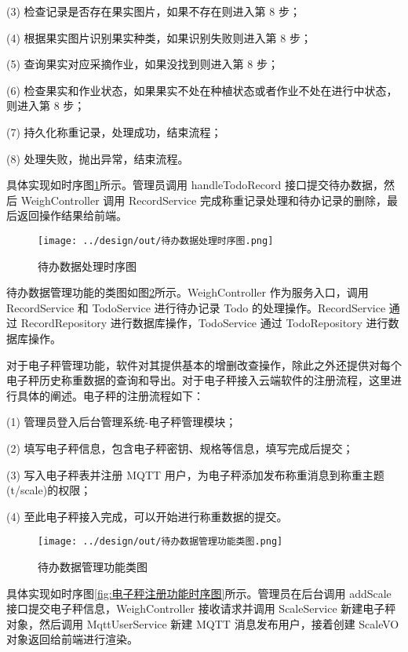 (3) 检查记录是否存在果实图片，如果不存在则进入第 8 步；

(4) 根据果实图片识别果实种类，如果识别失败则进入第 8 步；

(5) 查询果实对应采摘作业，如果没找到则进入第 8 步；

(6) 检查果实和作业状态，如果果实不处在种植状态或者作业不处在进行中状态，则进入第 8 步；

(7) 持久化称重记录，处理成功，结束流程；

(8) 处理失败，抛出异常，结束流程。

具体实现如时序图\ref{fig:待办数据处理时序图}所示。管理员调用 handleTodoRecord 接口提交待办数据，然后 WeighController 调用 RecordService 完成称重记录处理和待办记录的删除，最后返回操作结果给前端。

\begin{figure}
    \centering
    \texttt{[image: ../design/out/待办数据处理时序图.png]}
    \caption{待办数据处理时序图}
    \label{fig:待办数据处理时序图}
\end{figure}

待办数据管理功能的类图如图\ref{fig:待办数据管理功能类图}所示。WeighController 作为服务入口，调用 RecordService 和 TodoService 进行待办记录 Todo 的处理操作。RecordService 通过 RecordRepository 进行数据库操作，TodoService 通过 TodoRepository 进行数据库操作。

对于电子秤管理功能，软件对其提供基本的增删改查操作，除此之外还提供对每个电子秤历史称重数据的查询和导出。对于电子秤接入云端软件的注册流程，这里进行具体的阐述。电子秤的注册流程如下：

(1) 管理员登入后台管理系统-电子秤管理模块；

(2) 填写电子秤信息，包含电子秤密钥、规格等信息，填写完成后提交；

(3) 写入电子秤表并注册 MQTT 用户，为电子秤添加发布称重消息到称重主题(t/scale)的权限；

(4) 至此电子秤接入完成，可以开始进行称重数据的提交。

\begin{figure}
    \centering
    \texttt{[image: ../design/out/待办数据管理功能类图.png]}
    \caption{待办数据管理功能类图}
    \label{fig:待办数据管理功能类图}
\end{figure}

具体实现如时序图\ref{fig:电子秤注册功能时序图}所示。管理员在后台调用 addScale 接口提交电子秤信息，WeighController 接收请求并调用 ScaleService 新建电子秤对象，然后调用 MqttUserService 新建 MQTT 消息发布用户，接着创建 ScaleVO 对象返回给前端进行渲染。

